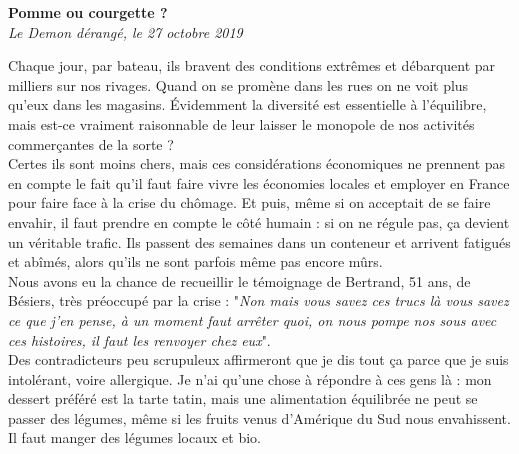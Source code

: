 \documentclass[french,12pt,amstex,a4paper]{article}
\begin{document}
\begin{center}
{\bf Pomme ou courgette ?}\\
{\it Le Demon dérangé, le 27 octobre 2019}\\
\end{center}

Chaque jour, par bateau, ils bravent des conditions extrêmes et débarquent par milliers sur nos rivages. Quand on se promène dans les rues on ne voit plus qu'eux dans les magasins. Évidemment la diversité est essentielle à l'équilibre, mais est-ce vraiment raisonnable de leur laisser le monopole de nos activités commerçantes de la sorte ?\\

Certes ils sont moins chers, mais ces considérations économiques ne prennent pas en compte le fait qu'il faut faire vivre les économies locales et employer en France pour faire face à la crise du chômage. Et puis, même si on acceptait de se faire envahir, il faut prendre en compte le côté humain : si on ne régule pas, ça devient un véritable trafic. Ils passent des semaines dans un conteneur et arrivent fatigués et abîmés, alors qu'ils ne sont parfois même pas encore mûrs.\\

Nous avons eu la chance de recueillir le témoignage de Bertrand, 51 ans, de Bésiers, très préoccupé par la crise : "{\it Non mais vous savez ces trucs là vous savez ce que j'en pense, à un moment faut arrêter quoi, on nous pompe nos sous avec ces histoires, il faut les renvoyer chez eux}".\\

Des contradicteurs peu scrupuleux affirmeront que je dis tout ça parce que je suis intolérant, voire allergique. Je n'ai qu'une chose à répondre à ces gens là : mon dessert préféré est la tarte tatin, mais une alimentation équilibrée ne peut se passer des légumes, même si les fruits venus d'Amérique du Sud nous envahissent. Il faut manger des légumes locaux et bio.\\
\end{document}
